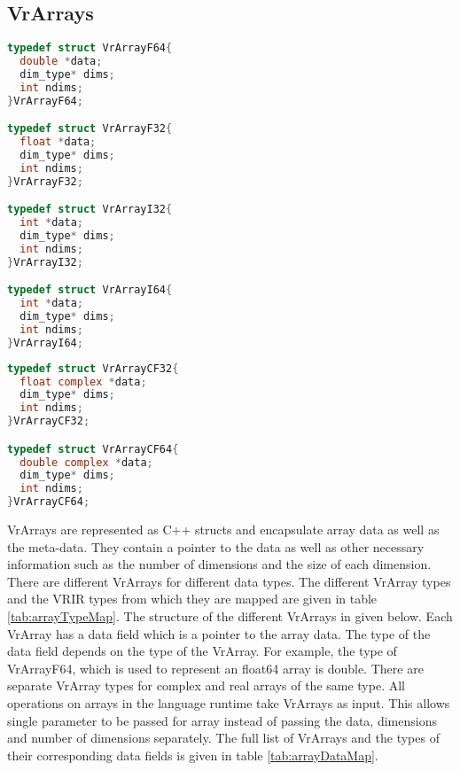 \subsection{VrArrays}
\label{subsec:vrarrays}
\begin{lstlisting}[float,language=c, label={vrArrayF64Struct}, caption={Structures of VrArrays for real data}]
typedef struct VrArrayF64{
  double *data;
  dim_type* dims;  
  int ndims;
}VrArrayF64;

typedef struct VrArrayF32{
  float *data;
  dim_type* dims;  
  int ndims;
}VrArrayF32;

typedef struct VrArrayI32{
  int *data;
  dim_type* dims;  
  int ndims;
}VrArrayI32;

typedef struct VrArrayI64{
  int *data;
  dim_type* dims;  
  int ndims;
}VrArrayI64;

\end{lstlisting}

\begin{lstlisting}[float,language=c, label={vrArrayF64Struct}, caption={Structures of VrArrays for complex data}]
typedef struct VrArrayCF32{
  float complex *data;
  dim_type* dims;  
  int ndims;
}VrArrayCF32;

typedef struct VrArrayCF64{
  double complex *data;
  dim_type* dims;  
  int ndims;
}VrArrayCF64;
\end{lstlisting}
VrArrays are represented as C++ structs and encapsulate array data as well as the meta-data. They contain a pointer to the data as well as other necessary information such as the number of dimensions and the size of each dimension. There are different VrArrays for different data types. The different VrArray types and the VRIR types from which they are mapped are given in table \ref{tab:arrayTypeMap}. The structure of the different VrArrays in given below. Each VrArray has a data field which is a pointer to the array data. The type of the data field depends on the type of the VrArray. For example, the type of VrArrayF64, which is used to represent an float64 array is double. 
There are separate VrArray types for complex and real arrays of the same type. All operations on arrays in the language runtime take VrArrays as input. This allows single parameter to be passed for array instead of passing the data, dimensions and number of dimensions separately. The full list of VrArrays and the types of their corresponding data fields is given in table \ref{tab:arrayDataMap}.
